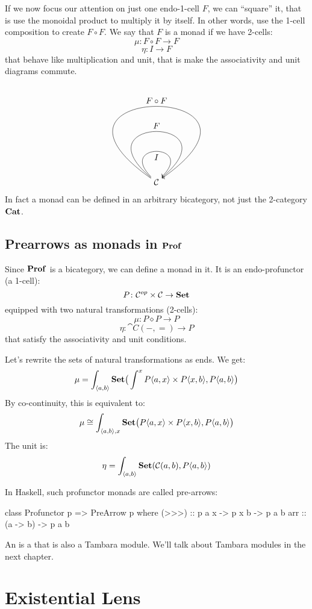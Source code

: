 \documentclass[DaoFP]{subfiles}
\begin{document}
If we now focus our attention on just one endo-1-cell $F$, we can ``square'' it, that is use the monoidal product to multiply it by itself. In other words, use the 1-cell composition to create $F \circ F$. We say that $F$ is a monad if we have 2-cells:
\[ \mu \colon F \circ F \to F \]
\[ \eta \colon I \to F \]
that behave like multiplication and unit, that is make the associativity and unit diagrams commute. 
\[
   \begin{tikzpicture}
        \node [] (star) {$\cat C$} ;
        \path[->,draw] (star) to  [in=45,out=135, loop,distance=2cm] node[ below] {$I$} (star);
        \path[->,draw] (star) to  [in=40,out=140, loop,distance=4cm] node[above] {$F$} (star);
        \path[->,draw] (star) to  [ in=35,out=145, loop,distance=7cm] node[auto] {$F \circ F$} (star);
    \end{tikzpicture}
\]
In fact a monad can be defined in an arbitrary bicategory, not just the 2-category $\mathbf{Cat}$. 

\subsection{Prearrows as monads in $\mathbf{Prof}$}

Since $\mathbf{Prof}$ is a bicategory, we can define a monad in it. It is an endo-profunctor (a 1-cell):
\[ P \colon \mathcal{C}^{op} \times \mathcal{C} \to \mathbf{Set} \]
equipped with two natural transformations (2-cells):
\[ \mu \colon P \diamond P \to P \]
\[ \eta \colon \cat C(-, =) \to P \]
that satisfy the associativity and unit conditions.

Let's rewrite the sets of natural transformations as ends. We get:
\[ \mu = \int_{\langle a, b \rangle} \mathbf{Set} \big( \int^x P \langle a, x \rangle \times P \langle x, b \rangle,  P\langle a, b \rangle \big) \]
By co-continuity, this is equivalent to:
\[ \mu \cong \int_{\langle a, b \rangle, x} \mathbf{Set} \big(P \langle a, x \rangle \times P \langle x, b \rangle,  P\langle a, b \rangle \big) \]
The unit is:
\[ \eta = \int_{\langle a, b \rangle} \mathbf{Set} (\mathcal{C}(a, b), P\langle a, b \rangle) \]

In Haskell, such profunctor monads are called pre-arrows:
\begin{haskell}
class Profunctor p => PreArrow p where
  (>>>) :: p a x -> p x b -> p a b
  arr   :: (a -> b) -> p a b
\end{haskell}
An  is a  that is also a Tambara module. We'll talk about Tambara modules in the next chapter.

\section{Existential Lens}
\end{document}
